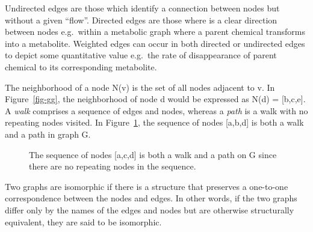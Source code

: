 \documentclass[
  super,
  preprint,
  3p]{elsarticle}
\begin{document}
Undirected edges are those which identify a connection between nodes but
without a given ``flow''. Directed edges are those where is a clear
direction between nodes e.g.~within a metabolic graph where a parent
chemical transforms into a metabolite. Weighted edges can occur in both
directed or undirected edges to depict some quantitative value e.g.~the
rate of disappearance of parent chemical to its corresponding
metabolite.

The neighborhood of a node N(v) is the set of all nodes adjacent to v.
In Figure~\ref{fig-gg}, the neighborhood of node d would be expressed as
N(d) = {[}b,c,e{]}. A \emph{walk} comprises a sequence of edges and
nodes, whereas a \emph{path} is a walk with no repeating nodes visited.
In Figure~\ref{fig-path}, the sequence of nodes {[}a,b,d{]} is both a
walk and a path in graph G.

\begin{figure}


\caption{\label{fig-path}The sequence of nodes {[}a,c,d{]} is both a
walk and a path on G since there are no repeating nodes in the
sequence.}

\end{figure}%

Two graphs are isomorphic if there is a structure that preserves a
one-to-one correspondence between the nodes and edges. In other words,
if the two graphs differ only by the names of the edges and nodes but
are otherwise structurally equivalent, they are said to be isomorphic.
\end{document}
